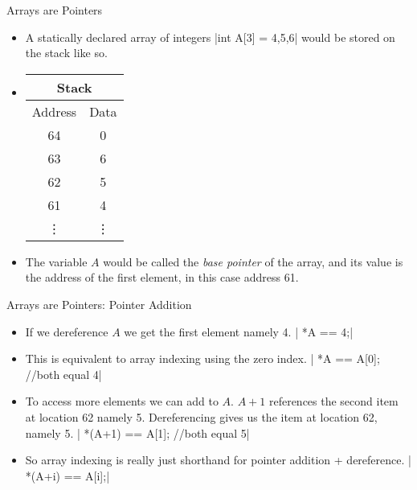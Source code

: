 \documentclass[10pt]{beamer}
\begin{document}
\begin{frame}[fragile]{Arrays are Pointers}
	\begin{itemize}[<+->]
	\item A statically declared array of integers
	|int A[3] = {4,5,6}|
	would be stored on the stack like so.
	\item \begin{tabular}{|c|c|}
		\hline
		\multicolumn{2}{|c|}{Stack}\\
		\hline
		Address & Data\\
		\hline
		64 &	0\\
		\hline
		63 &	6\\
		\hline
		62 &	5\\
		\hline
		61 &	4\\
		\hline
		\vdots & \vdots \\
		\hline
	\end{tabular}
	\item The variable $A$ would be called the {\it base pointer} of the array, and its value is the address of the first element, in this case address 61.
	\end{itemize}
\end{frame}

\begin{frame}[fragile]{Arrays are Pointers: Pointer Addition}
	\begin{itemize}[<+->]
		\item If we dereference $A$ we get the first element namely 4.
		| *A == 4;|
		\item This is equivalent to array indexing using the zero index.
		| *A == A[0]; //both equal 4|
		\item To access more elements we can add to $A$. $A+1$ references the second item at location 62 namely 5. Dereferencing gives us the item at location 62, namely 5.
		| *(A+1) == A[1]; //both equal 5|
		\item So array indexing is really just shorthand for pointer addition + dereference.
		| *(A+i) == A[i];|
	\end{itemize}
\end{frame}
\end{document}
